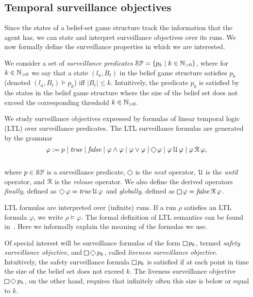 \subsection{Temporal surveillance objectives}
Since the states of a belief-set game structure track the information that the agent has, we can state and interpret surveillance objectives over its runs. We now formally define the surveillance properties in which we are interested. 

We consider a set of \emph{surveillance predicates} $\mathcal{SP} = \{p_k \mid k \in \mathbb{N}_{>0}\}$, where for $k \in \mathbb{N}_{>0}$ we say that a state $(l_a,B_t)$ in the belief game structure satisfies $p_k$ (denoted $(l_a,B_t) \models p_k$) iff 
$|B_t| \leq k$. Intuitively, the predicate $p_k$ is satisfied by the states in the belief game structure where the size of the belief set does not exceed the corresponding threshold $k \in \mathbb{N}_{>0}$.

We study surveillance objectives expressed by formulas of linear temporal logic (LTL) over surveillance predicates.
 The LTL surveillance formulas  are generated by the grammar\\
\[\varphi := p \mid \true \mid \false \mid \varphi \wedge \varphi \mid \varphi \vee \varphi \mid \LTLnext  \varphi  \mid \varphi \LTLuntil \varphi \mid \varphi \LTLrelease \varphi,\]\\
where $p \in \mathcal{SP}$ is a surveillance predicate, $\LTLnext$ is the \emph{next} operator, $\operatorname{\mathcal{U}}$ is the \emph{until} operator, and $\operatorname{\mathcal{R}}$ is the \emph{release} operator. We also define the derived operators 
\emph{finally}, defined as $\LTLfinally \varphi = \true \LTLuntil \varphi$ and 
\emph{globally}, defined as $\LTLglobally \varphi = \false \LTLrelease \varphi$.

LTL formulas are interpreted over (infinite) runs. If a run $\rho$ satisfies an LTL formula $\varphi$, we write $\rho \models \varphi$. The formal definition of LTL semantics can be found in~\cite{BaierKatoen08}. Here we informally explain the meaning of the formulas we use.

Of special interest will be surveillance formulas of the form $\LTLglobally p_k$, termed \emph{safety surveillance objective}, and $\LTLglobally\LTLfinally p_k$, called \emph{liveness surveillance objective}.
Intuitively, the safety surveillance formula $\LTLglobally p_k$ is satisfied if at each point in time the size of the belief set does not exceed $k$. The liveness surveillance objective $\LTLglobally\LTLfinally p_k$, on the other hand, requires that infinitely often this size is below or equal to $k$.

